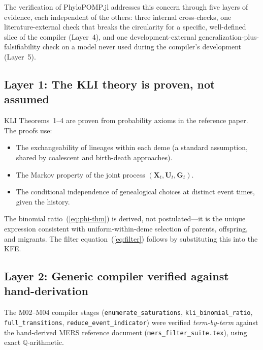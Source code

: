 \documentclass[11pt,leqno]{article}
\newcommand{\Xr}{\mathbf{X}}        %
\newcommand{\Gr}{\mathbf{G}}        %
\newcommand{\Ur}{\mathbf{U}}        %
\newcommand{\pkg}[1]{\textsf{#1}}
\newcommand{\code}[1]{\texttt{#1}}
\theoremstyle{plain}
\theoremstyle{definition}
\begin{document}
The verification of \pkg{PhyloPOMP.jl} addresses this concern through
five layers of evidence, each independent of the others: three internal
cross-checks, one literature-external check that breaks the circularity
for a specific, well-defined slice of the compiler (Layer~4), and one
development-external generalization-plus-falsifiability check on a model
never used during the compiler's development (Layer~5).

\subsection{Layer 1: The KLI theory is proven, not assumed}

KLI Theorems~1--4 are proven from probability axioms in the reference
paper.  The proofs use:
\begin{itemize}
  \item The exchangeability of lineages within each deme (a standard
    assumption, shared by coalescent and birth-death approaches).
  \item The Markov property of the joint process
    $(\Xr_t, \Ur_t, \Gr_t)$.
  \item The conditional independence of genealogical choices at distinct
    event times, given the history.
\end{itemize}
The binomial ratio~(\ref{eq:phi-thm}) is derived, not postulated---it
is the unique expression consistent with uniform-within-deme selection
of parents, offspring, and migrants.  The filter
equation~(\ref{eq:filter}) follows by substituting this into the KFE.

\subsection{Layer 2: Generic compiler verified against hand-derivation}

The M02--M04 compiler stages (\code{enumerate\_saturations},
\code{kli\_binomial\_ratio}, \code{full\_transitions},
\code{reduce\_event\_indicator}) were verified \emph{term-by-term}
against the hand-derived MERS reference document
(\code{mers\_filter\_suite.tex}), using exact $\mathbb{Q}$-arithmetic.
\end{document}
